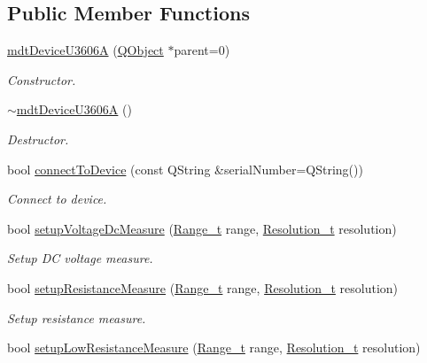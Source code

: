 \subsection*{Public Member Functions}
\begin{DoxyCompactItemize}
\item 
\hyperlink{classmdt_device_u3606_a_a91201ae14df7b553a947b5857eaa1c65}{mdt\-Device\-U3606\-A} (\hyperlink{class_q_object}{Q\-Object} $\ast$parent=0)
\begin{DoxyCompactList}\small\item\em Constructor. \end{DoxyCompactList}\item 
\hyperlink{classmdt_device_u3606_a_a7d2fb26475e72cce95ca6be384d569b7}{$\sim$mdt\-Device\-U3606\-A} ()
\begin{DoxyCompactList}\small\item\em Destructor. \end{DoxyCompactList}\item 
bool \hyperlink{classmdt_device_u3606_a_a8470e8f5f56ab635d2b2718a1bb54034}{connect\-To\-Device} (const Q\-String \&serial\-Number=Q\-String())
\begin{DoxyCompactList}\small\item\em Connect to device. \end{DoxyCompactList}\item 
bool \hyperlink{classmdt_device_u3606_a_af71cd0206a4f91fc1b250780ceb72919}{setup\-Voltage\-Dc\-Measure} (\hyperlink{classmdt_device_u3606_a_a8171d28878e8609c98d4cea591b7cc37}{Range\-\_\-t} range, \hyperlink{classmdt_device_u3606_a_a136af13281bde380abeabe358c399dc5}{Resolution\-\_\-t} resolution)
\begin{DoxyCompactList}\small\item\em Setup D\-C voltage measure. \end{DoxyCompactList}\item 
bool \hyperlink{classmdt_device_u3606_a_ac7b3bb6534b628cce4f465796b65c74f}{setup\-Resistance\-Measure} (\hyperlink{classmdt_device_u3606_a_a8171d28878e8609c98d4cea591b7cc37}{Range\-\_\-t} range, \hyperlink{classmdt_device_u3606_a_a136af13281bde380abeabe358c399dc5}{Resolution\-\_\-t} resolution)
\begin{DoxyCompactList}\small\item\em Setup resistance measure. \end{DoxyCompactList}\item 
bool \hyperlink{classmdt_device_u3606_a_a37ee631efe112bc57c3707f266880cec}{setup\-Low\-Resistance\-Measure} (\hyperlink{classmdt_device_u3606_a_a8171d28878e8609c98d4cea591b7cc37}{Range\-\_\-t} range, \hyperlink{classmdt_device_u3606_a_a136af13281bde380abeabe358c399dc5}{Resolution\-\_\-t} resolution)

\end{DoxyCompactItemize}
